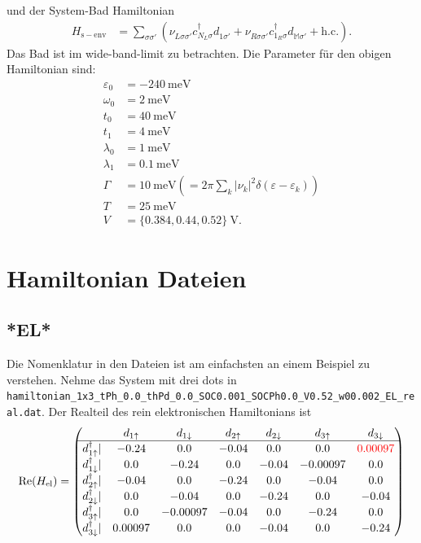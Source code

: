 \documentclass{article}
\newcommand{\pdagger}{{\phantom{\dagger}}}
\begin{document}
und der System-Bad Hamiltonian
\begin{align}
	H_\mathrm{s-env} &= \sum_{\sigma\sigma'}(\nu_{L\sigma\sigma'}^\pdagger c_{N_L\sigma}^\dagger d_{1\sigma'}^\pdagger + \nu_{R\sigma\sigma'}^\pdagger c_{1_R\sigma}^\dagger d_{\mathbb{M}\sigma'}^\pdagger + \mathrm{h.c.}). \label{eq:LeadSysHamiltonian}
\end{align} 
Das Bad ist im wide-band-limit zu betrachten. Die Parameter für den obigen Hamiltonian sind:
\begin{align*}
	\varepsilon_0 &= \SI{-240}{\milli\electronvolt}\\
	\omega_0 &= \SI{2}{\milli\electronvolt}\\
	t_0 &= \SI{40}{\milli\electronvolt}\\
	t_1 &= \SI{4}{\milli\electronvolt}\\
	\lambda_0 &= \SI{1}{\milli\electronvolt}\\
	\lambda_1 &= \SI{0.1}{\milli\electronvolt}\\
	\Gamma &= \SI{10}{\milli\electronvolt} (=2\pi \sum_k \vert \nu_k\vert^2\delta(\varepsilon-\varepsilon_k) )\\
	T &= \SI{25}{\milli\electronvolt}\\
	V &= \{0.384,0.44,0.52\}\SI{}{\volt}.
\end{align*}
\section{Hamiltonian Dateien}
\subsection{*EL*}
Die Nomenklatur in den Dateien ist am einfachsten an einem Beispiel zu verstehen. Nehme das System mit drei dots in \texttt{hamiltonian\_1x3\_tPh\_0.0\_thPd\_0.0\_SOC0.001\_SOCPh0.0\_V0.52\_w00.002\_EL\_real.dat}. Der Realteil des rein elektronischen Hamiltonians ist 
\begin{equation}
\mathrm{Re}(H_\mathrm{el}) = \begin{pmatrix}
	& d_{1\uparrow} & d_{1\downarrow} & d_{2\uparrow} & d_{2\downarrow} & d_{3\uparrow} & d_{3\downarrow}\\ \hline
	d_{1\uparrow}^\dagger | & -0.24 &  0.0     &-0.04  & 0.0    & 0.0   &  {\color{red}0.00097}\\
	d_{1\downarrow}^\dagger |&0.0   &  -0.24  & 0.0    & -0.04  & -0.00097 & 0.0\\
	d_{2\uparrow}^\dagger| &-0.04 &  0.0    & -0.24  & 0.0    & -0.04 &  0.0\\
	d_{2\downarrow}^\dagger| & 0.0    & -0.04  & 0.0     &-0.24  & 0.0   &  -0.04\\
	d_{3\uparrow}^\dagger| &0.0    & -0.00097  &-0.04 &  0.0 &    -0.24 &  0.0\\
	d_{3\downarrow}^\dagger| &0.00097 &  0.0   &  0.0 &    -0.04  & 0.0  &   -0.24	
\end{pmatrix}
\end{equation}
\end{document}
